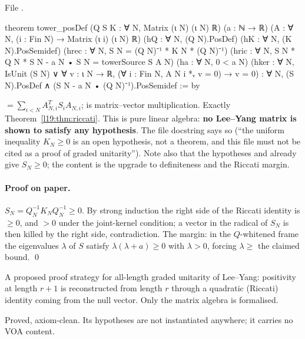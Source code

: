 \noindent File .
\begin{leancode}
theorem tower_posDef (Q S K : ∀ N, Matrix (ι N) (ι N) ℝ) (a : ℕ → ℝ)
    (A : ∀ N, (i : Fin N) → Matrix (ι i) (ι N) ℝ)
    (hQ : ∀ N, (Q N).PosDef) (hK : ∀ N, (K N).PosSemidef)
    (hrec : ∀ N, S N = (Q N)⁻¹ * K N * (Q N)⁻¹)
    (hric : ∀ N, S N * Q N * S N - a N • S N = towerSource S A N)
    (ha : ∀ N, 0 < a N)
    (hker : ∀ N, IsUnit (S N) ∨ ∀ v : ι N → ℝ, (∀ i : Fin N, A N i *ᵥ v = 0) → v = 0) :
    ∀ N, (S N).PosDef ∧ (S N - a N • (Q N)⁻¹).PosSemidef := by
\end{leancode}

\begin{dictionary}
 $= \sum_{i<N}A_{N,i}^TS_iA_{N,i}$;  is matrix--vector multiplication.
Exactly Theorem~\ref{l19:thm:riccati}. This is pure linear algebra: \textbf{no Lee--Yang matrix is shown to
satisfy any hypothesis}. The file docstring says so (``the uniform inequality $K_N\ge0$ is an open
hypothesis, not a theorem, and this file must not be cited as a proof of graded unitarity''). Note also that
the hypotheses  and  already give $S_N\ge0$; the content is the upgrade to definiteness
and the Riccati margin.
\end{dictionary}

\paragraph{Proof on paper.} $S_N = Q_N^{-1}K_NQ_N^{-1}\ge0$. By strong induction the right side of the
Riccati identity is $\ge0$, and $>0$ under the joint-kernel condition; a vector in the radical of $S_N$ is
then killed by the right side, contradiction. The margin: in the $Q$-whitened frame the eigenvalues
$\lambda$ of $S$ satisfy $\lambda(\lambda+a)\ge0$ with $\lambda>0$, forcing $\lambda\ge$ the claimed bound. \qed

\begin{physics}
A proposed proof strategy for all-length graded unitarity of Lee--Yang: positivity at length $r+1$ is
reconstructed from length $r$ through a quadratic (Riccati) identity coming from the null vector. Only the
matrix algebra is formalised.
\end{physics}

\begin{status}
Proved, axiom-clean. Its hypotheses are not instantiated anywhere; it carries no VOA content.
\end{status}

